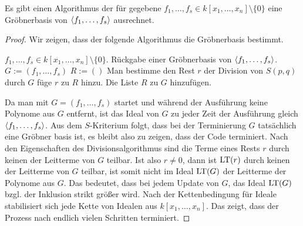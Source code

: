 \documentclass[11pt]{article}
\numberwithin{equation}{section}
\begin{document}
\begin{theorem}
	Es gibt einen Algorithmus der für gegebene $f_1,\ldots,f_s \in k[x_1,\ldots,x_n] \setminus \{0\}$ eine Gröbnerbasis von $\left< f_1,\ldots,f_s \right>$ ausrechnet. 
\end{theorem} 
\begin{proof}
	Wir zeigen, dass der folgende Algorithmus die Gröbnerbasis bestimmt. 
\begin{algorithm}[H]
	\caption{$\cc{Groebner-Basis}(f_1,\ldots,f_s)$}
	\begin{algorithmic}[1]
		\REQUIRE $f_1,\ldots,f_s \in k[x_1,\ldots,x_n] \setminus \{0\}$. 
		\ENSURE Rückgabe einer Gröbnerbasis von $\left< f_1,\ldots,f_s \right>$. 
		\STATE $G:= (f_1,\ldots,f_s)$ 
			\STATE $R:=()$   
				\STATE Man bestimme  den Rest $r$ der Division von $S(p,q)$ durch $G$
					\STATE füge $r$ zu $R$ hinzu. 
			\ENDIF 
				\ENDIF 
				\STATE 	Die Liste $R$ zu $G$ hinzufügen. 
			\ENDFOR 
		\ENDWHILE 
	\end{algorithmic} 
\end{algorithm} 

	Da man mit $G = (f_1,\ldots,f_s)$ startet und während der Ausführung keine Polynome aus $G$ entfernt, ist das Ideal von $G$ zu jeder Zeit der Ausführung gleich $\left< f_1,\ldots,f_s \right>$. Aus dem $S$-Kriterium folgt, dass bei der Terminierung $G$ tatsächlich eine Gröbner basis ist, es bleibt also zu zeigen, dass der Code terminiert. Nach den Eigenschaften des Divisionsalgorithmus sind die Terme eines Rests $r$ durch keinen der Leitterme von $G$ teilbar. Ist also $r  \ne 0$, dann ist $\operatorname{LT}(r)$ durch keinen der Leitterme von $G$ teilbar, ist somit nicht im Ideal $\operatorname{LT}(G)$ der Leitterme der Polynome aus $G$. Das bedeutet, dass bei jedem Update von $G$, das Ideal $\operatorname{LT}(G)$ bzgl. der Inklusion strikt größer wird. Nach der Kettenbedingung  für Ideale stabilisiert sich jede Kette von Idealen aus $k[x_1,\ldots,x_n]$. Das zeigt, dass der Prozess nach endlich vielen Schritten terminiert. 
\end{proof} 
\end{document}
